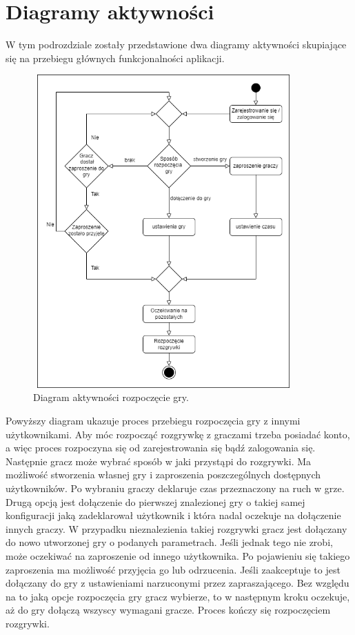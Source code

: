 \section{Diagramy aktywności}

W tym podrozdziale zostały przedstawione dwa diagramy aktywności skupiające się na przebiegu głównych funkcjonalności aplikacji.

\begin{figure}[h!]
	\begin{center}
		\includegraphics[width=10cm,height=12cm]{img/activity-diagram-start-game.png}
	\end{center}
	\caption{{\color{dgray} Diagram aktywności rozpoczęcie gry.}} 
	\label{diagram-aktywnosci-start}
\end{figure}

Powyższy diagram ukazuje proces przebiegu rozpoczęcia gry z innymi użytkownikami. Aby móc rozpocząć rozgrywkę z graczami trzeba posiadać konto, a więc proces rozpoczyna się od zarejestrowania się bądź zalogowania się. Następnie gracz może wybrać sposób w jaki przystąpi do rozgrywki. Ma możliwość stworzenia własnej gry i zaproszenia poszczególnych dostępnych użytkowników. Po wybraniu graczy deklaruje czas przeznaczony na ruch w grze. Drugą opcją jest dołączenie do pierwszej znalezionej gry o takiej samej konfiguracji jaką zadeklarował użytkownik i która nadal oczekuje na dołączenie innych graczy. W przypadku nieznalezienia takiej rozgrywki gracz jest dołączany do nowo utworzonej gry o podanych parametrach. Jeśli jednak tego nie zrobi, może oczekiwać na zaproszenie od innego użytkownika. Po pojawieniu się takiego zaproszenia ma możliwość przyjęcia go lub odrzucenia. Jeśli zaakceptuje to jest dołączany do gry z ustawieniami narzuconymi przez zapraszającego. Bez względu na to jaką opcje rozpoczęcia gry gracz wybierze, to w następnym kroku oczekuje, aż do gry dołączą wszyscy wymagani gracze. Proces kończy się rozpoczęciem rozgrywki. \\ \\ \\ \\ \\

